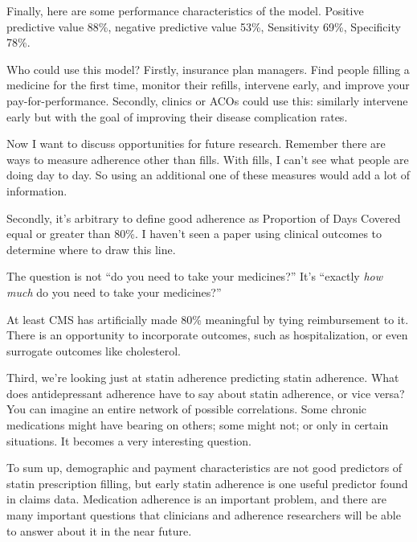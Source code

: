 \documentclass[12pt]{report}
\begin{document}
\begin{large}
Finally, here are some performance characteristics of the model.
Positive predictive value 88\%, negative predictive value 53\%,
Sensitivity 69\%, Specificity 78\%. %

Who could use this model? Firstly, insurance plan managers. Find
people filling a medicine for the first time, monitor their refills,
intervene early, and improve your pay-for-performance. Secondly,
clinics or ACOs could use this: similarly intervene early but with the
goal of improving their disease complication rates. %

Now I want to discuss opportunities for future research. Remember
there are ways to measure adherence other than fills. With fills, I
can't see what people are doing day to day. So using an additional one
of these measures would add a lot of information.

Secondly, it's arbitrary to define good adherence as Proportion of
Days Covered equal or greater than 80\%. I haven't seen a paper using
clinical outcomes to determine where to draw this line.

\end{large}

The question is not ``do you need to take your medicines?'' It's
``exactly \emph{how much} do you need to take your medicines?''

\begin{large}

At least CMS has artificially made 80\% meaningful by tying
reimbursement to it. There is an opportunity to incorporate outcomes,
such as hospitalization, or even surrogate outcomes like cholesterol.

Third, we're looking just at statin adherence predicting statin
adherence. What does antidepressant adherence have to say about statin
adherence, or vice versa? You can imagine an entire network of
possible correlations. Some chronic medications might have bearing on
others; some might not; or only in certain situations. It becomes a
very interesting question.

To sum up, demographic and payment characteristics are not good
predictors of statin prescription filling, but early statin adherence
is one useful predictor found in claims data. Medication adherence is
an important problem, and there are many important questions that
clinicians and adherence researchers will be able to answer about it
in the near future.



\end{large}
\end{document}
